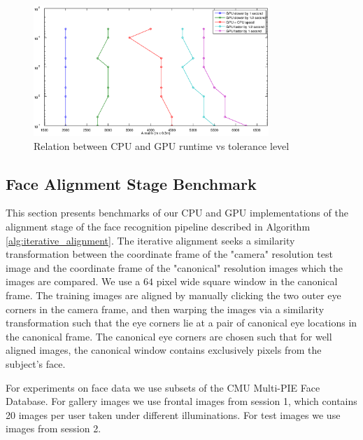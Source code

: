 \documentclass[10pt,twocolumn,letterpaper]{article}
\begin{document}
\begin{figure}
\begin{center}
\includegraphics[width=3.5in]{results/random_data/size_vs_speed_crossover_ratio_3}
\end{center}
\caption{Relation between CPU and GPU runtime vs tolerance level}
\label{fig:random_data2}
\end{figure}

\subsection{Face Alignment Stage Benchmark} 
\label{sec:alignment_benchmark}
This section presents benchmarks of our CPU and GPU implementations of the
alignment stage of the face recognition pipeline described in Algorithm
\ref{alg:iterative_alignment}.  The iterative alignment seeks a similarity
transformation between the coordinate frame of the "camera" resolution test
image and the coordinate frame of the "canonical" resolution images which the
images are compared.  We use a $64$ pixel wide square window in the canonical
frame.  The training images are aligned by manually clicking the two outer eye
corners in the camera frame, and then warping the images via a similarity
transformation such that the eye corners lie at a pair of canonical eye
locations in the canonical frame.  The canonical eye corners are chosen such
that for well aligned images, the canonical window contains exclusively pixels
from the subject's face. 

For experiments on face data we use subsets of the CMU Multi-PIE Face Database.
For gallery images we use frontal images from session 1, which contains 20
images per user taken under different illuminations. For test images we use
images from session 2.  
\end{document}
